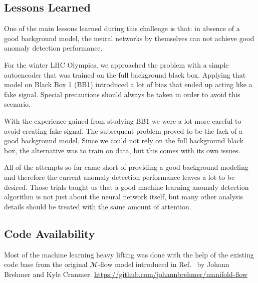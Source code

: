 \documentclass[letterpaper,11pt]{article}
\begin{document}

\subsection{Lessons Learned}
\label{sec:lessons}

One of the main lessons learned during this challenge is that: in absence of a good background model, the neural networks by themselves can not achieve good anomaly detection performance. 

For the winter LHC Olympics, we approached the problem with a simple autoencoder that was trained on the full background black box. Applying that model on Black Box 1 (BB1) introduced a lot of bias that ended up acting like a fake signal. Special precautions should always be taken in order to avoid this scenario.

With the experience gained from studying BB1 we were a lot more careful to avoid creating fake signal. The subsequent problem proved to be the lack of a good background model. Since we could not rely on the full background black box, the alternative was to train on data, but this comes with its own issues. 

All of the attempts so far came short of providing a good background modeling and therefore the current anomaly detection performance leaves a lot to be desired. Those trials taught us that a good machine learning anomaly detection algorithm is not just about the neural network itself, but many other analysis details should be treated with the same amount of attention.



\subsection{Code Availability}
\label{code:code}

Most of the machine learning heavy lifting was done with the help of the existing code base from the original $\mathcal{M}$-flow model introduced in Ref.~\cite{Brehmer:2020vwc} by Johann Brehmer and Kyle Cranmer. \href{https://github.com/johannbrehmer/manifold-flow}{https://github.com/johannbrehmer/manifold-flow} 
\end{document}
